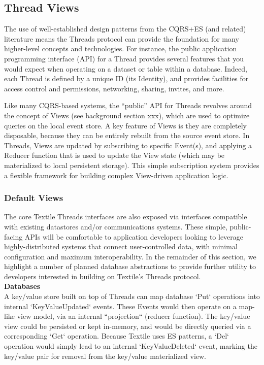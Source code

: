 \documentclass{comjnl}
\begin{document}
\subsection{Thread Views} \label{sec:threadviews}

The use of well-established design patterns from the CQRS+ES (and related) literature means the Threads protocol can provide the foundation for many higher-level concepts and technologies. For instance, the public application programming interface (API) for a Thread provides several features that you would expect when operating on a dataset or table within a database. Indeed, each Thread is defined by a unique ID (its Identity), and provides facilities for access control and permissions, networking, sharing, invites, and more.

Like many CQRS-based systems, the “public” API for Threads revolves around the concept of Views (see background section xxx), which are used to optimize queries on the local event store. A key feature of Views is they are completely disposable, because they can be entirely rebuilt from the source event store. In Threads, Views are updated by subscribing to specific Event(s), and applying a Reducer function that is used to update the View state (which may be materialized to local persistent storage). This simple subscription system provides a flexible framework for building complex View-driven application logic.

\subsubsection{Default Views}

The core Textile Threads interfaces are also exposed via interfaces compatible with existing datastores and/or communications systems. These simple, public-facing APIs will be comfortable to application developers looking to leverage highly-distributed systems that connect user-controlled data, with minimal configuration and maximum interoperability. In the remainder of this section, we highlight a number of planned database abstractions to provide further utility to developers interested in building on Textile’s Threads protocol.\\

\textbf{Databases} \\

A key/value store built on top of Threads can map database `Put` operations into internal `KeyValueUpdated` events. These Events would then operate on a map-like view model, via an internal “projection“ (reducer function). The key/value view could be persisted or kept in-memory, and would be directly queried via a corresponding `Get` operation. Because Textile uses ES patterns, a `Del` operation would simply lead to an internal `KeyValueDeleted` event, marking the key/value pair for removal from the key/value materialized view.
\end{document}

